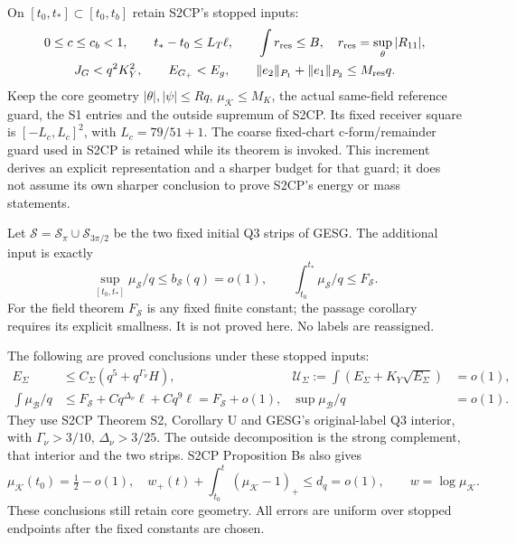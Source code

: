 \documentclass[11pt]{article}
\theoremstyle{remark}\newtheorem{remark}[theorem]{Remark}
\newcommand{\KK}{\mathcal K}
\newcommand{\BB}{\mathcal B}
\newcommand{\Gp}{G_+}
\begin{document}
On $[t_0,t_*]\subset[t_0,t_b]$ retain S2CP's stopped inputs:
\begin{equation}
 \begin{gathered}
 0\le c\le c_b<1,\qquad t_*-t_0\le L_T\ell,\qquad
 \int r_{\rm res}\le B,\quad r_{\rm res}=\sup_\theta|R_{11}|,\\
 J_G<q^2K_Y^2,\qquad E_{\Gp}<E_g,\qquad
 \|e_2\|_{P_1}+\|e_1\|_{P_2}\le M_{\rm res}q.
 \end{gathered}
 \label{an03cfav1:guards}
\end{equation}
Keep the core geometry $|\theta|,|\psi|\le Rq$,
$\mu_{\KK}\le M_K$, the actual same-field reference guard,
the S1 entries and the outside supremum of S2CP. Its fixed
receiver square is $[-L_c,L_c]^2$, with
$L_c=79/51+1$. The coarse fixed-chart c-form/remainder guard
used in S2CP is retained while its theorem is invoked. This
increment derives an explicit representation and a sharper
budget for that guard; it does not assume its own sharper
conclusion to prove S2CP's energy or mass statements.

Let $\mathcal S=\mathcal S_\pi\cup\mathcal S_{3\pi/2}$ be the
two fixed initial Q3 strips of GESG. The additional input is
exactly
\begin{equation}
 \sup_{[t_0,t_*]}\mu_{\mathcal S}/q\le b_{\mathcal S}(q)=o(1),
 \qquad \int_{t_0}^{t_*}\mu_{\mathcal S}/q\le F_{\mathcal S}.
 \label{an03cfav1:strips}
\end{equation}
For the field theorem $F_{\mathcal S}$ is any fixed finite
constant; the passage corollary requires its explicit smallness.
It is not proved here. No labels are reassigned.

The following are proved conclusions under these stopped inputs:
\begin{align}
 E_\Sigma&\le C_\Sigma(q^5+q^{\Gamma_\nu}H),&
 \mathcal U_\Sigma:=\int(E_\Sigma+K_Y\sqrt{E_\Sigma})&=o(1),
 \label{an03cfav1:S2inputs}\\
 \int\mu_{\BB}/q&\le F_{\mathcal S}
           +Cq^{\Delta_\nu}\ell+Cq^9\ell
           =F_{\mathcal S}+o(1),&
 \sup\mu_{\BB}/q&=o(1).\nonumber
\end{align}
They use S2CP Theorem S2, Corollary U and GESG's original-label
Q3 interior, with $\Gamma_\nu>3/10$, $\Delta_\nu>3/25$.
The outside decomposition is the strong complement, that
interior and the two strips. S2CP Proposition Bs also gives
\begin{equation}
 \mu_{\KK}(t_0)=\tfrac12-o(1),\quad
 w_+(t)+\int_{t_0}^t(\mu_{\KK}-1)_+\le d_q=o(1),
 \qquad w=\log\mu_{\KK}.
 \label{an03cfav1:overshootinput}
\end{equation}
These conclusions still retain core geometry. All errors are
uniform over stopped endpoints after the fixed constants are
chosen.
\end{document}
